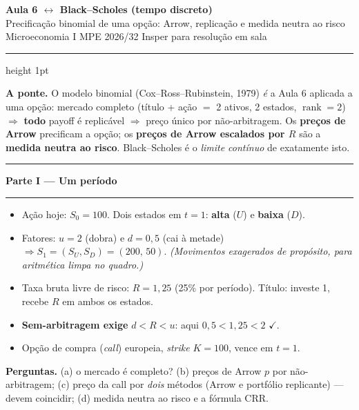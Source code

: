 \documentclass[11pt]{article}
\newcommand{\parteheader}[1]{%
  \bigskip
  {\color{insperred}\rule{\textwidth}{1.2pt}}\par
  \nopagebreak
  {\Large\bfseries\color{insperred} #1}\par
  \nopagebreak
  {\color{insperred}\rule{\textwidth}{0.4pt}}\par
  \smallskip}
\newcommand{\ck}{\ensuremath{\checkmark}}
\begin{document}
\begin{center}
  {\LARGE\bfseries\color{insperred} Aula 6 $\leftrightarrow$ Black--Scholes (tempo discreto)}\\[2pt]
  {\large Precificação binomial de uma opção: Arrow, replicação e medida neutra ao risco}\\[4pt]
  {\normalsize Microeconomia I \textbullet{} MPE 2026/32 \textbullet{} Insper \textbullet{} para resolução em sala}
\end{center}
\vspace{2pt}
{\color{insperred!40}\hrule height 1pt}
\vspace{4pt}

\begin{pontebox}
\textbf{A ponte.} O modelo binomial (Cox--Ross--Rubinstein, 1979) \emph{é} a Aula 6 aplicada a uma opção:
mercado completo (título + ação $=$ 2 ativos, 2 estados, $\operatorname{rank}=2$) $\Rightarrow$ \textbf{todo}
payoff é replicável $\Rightarrow$ preço único por não-arbitragem. Os \textbf{preços de Arrow} precificam a opção;
os \textbf{preços de Arrow escalados por $R$} são a \textbf{medida neutra ao risco}. Black--Scholes é o
\emph{limite contínuo} de exatamente isto.
\end{pontebox}

\parteheader{Parte I --- Um período}

\begin{setupbox}
\begin{itemize}[leftmargin=1.3em,itemsep=2pt,topsep=2pt]
  \item Ação hoje: $S_0=100$. Dois estados em $t=1$: \textbf{alta} ($U$) e \textbf{baixa} ($D$).
  \item Fatores: $u=2$ (dobra) e $d=0{,}5$ (cai à metade) $\Rightarrow S_1=(S_U,S_D)=(200,\,50)$.
        \emph{(Movimentos exagerados de propósito, para aritmética limpa no quadro.)}
  \item Taxa bruta livre de risco: $R=1{,}25$ (25\% por período). Título: investe 1, recebe $R$ em ambos os estados.
  \item \textbf{Sem-arbitragem exige} $d<R<u$: aqui $0{,}5<1{,}25<2$ \ck.
  \item Opção de compra (\emph{call}) europeia, \emph{strike} $K=100$, vence em $t=1$.
\end{itemize}
\textbf{Perguntas.} (a) o mercado é completo? (b) preços de Arrow $p$ por não-arbitragem; (c) preço da call por
\emph{dois} métodos (Arrow e portfólio replicante) --- devem coincidir; (d) medida neutra ao risco e a fórmula CRR.
\end{setupbox}
\end{document}
